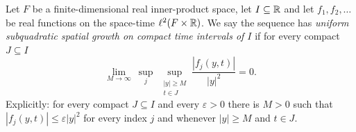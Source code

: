 \begin{definition}
Let $F$ be a finite-dimensional real inner-product space, let $I\subseteq\mathbb{R}$ and
let $f_1,f_2,\ldots$ be real functions on the space-time $\ell^2(F\times\mathbb{R})$. We
say the sequence has \emph{uniform subquadratic spatial growth on compact time
intervals of $I$} if for every compact $J\subseteq I$
\[
  \lim_{M\to\infty}\ \sup_j\ \sup_{\substack{|y|\ge M\\ t\in J}}
      \frac{|f_j(y,t)|}{|y|^2}=0 .
\]
Explicitly: for every compact $J\subseteq I$ and every $\varepsilon>0$ there is
$M>0$ such that $|f_j(y,t)|\le\varepsilon|y|^2$ for every index $j$ and whenever
$|y|\ge M$ and $t\in J$.
\end{definition}
